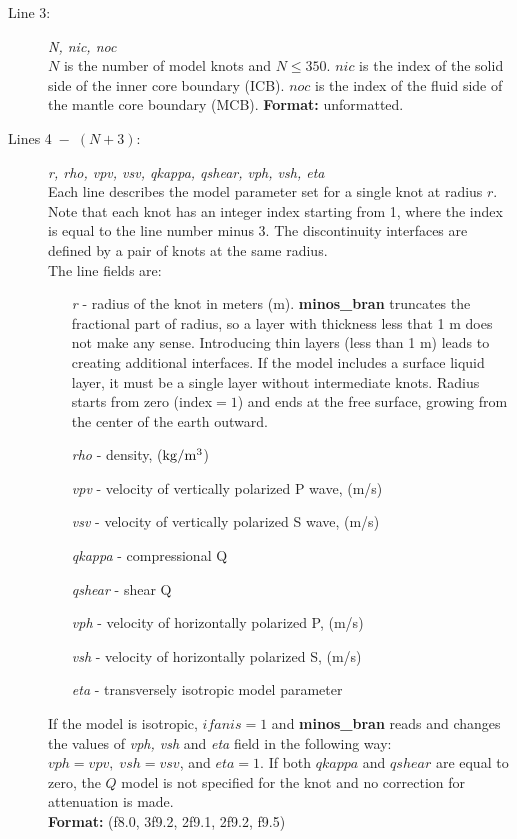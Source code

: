 \documentclass[11pt]{article}
\begin{document}
\begin{description}
\item[Line 3:] {\it N, nic, noc} \\
$N$ is the number of model knots and $N \leq 350$. $nic$ is the 
index of the solid side of the inner core boundary (ICB). $noc$ is the index of the
fluid side of the mantle core boundary (MCB). 
{\bf Format:} unformatted.
\item[Lines 4$\;-\;(N+3)$:] {\it r, rho, vpv, vsv, qkappa, qshear, vph, vsh, eta} \\
Each line describes the model parameter set for a single knot at radius $r$. 
Note that each knot has an integer index starting from 1, where the index is
equal to the line number minus 3. The discontinuity interfaces are
defined by a pair of knots at the same radius. \\
The line fields are:
\begin{itemize}
\item[{\it r}] - radius of the knot in meters (m). {\bf minos\_bran}
truncates the fractional part of radius, so a layer with thickness less that 1 m 
does not make any sense. Introducing thin layers (less than 1 m) leads to 
creating additional interfaces. If the model includes a surface liquid layer,
it must be a single layer without intermediate knots.
Radius starts from zero (index$=1$) and ends at the free surface,
growing from the center of the earth outward.
\item[{\it rho}] - density, ($\rm kg/m^3$)
\item[{\it vpv}] - velocity of vertically polarized P wave, (m/s)
\item[{\it vsv}] - velocity of vertically polarized S wave, (m/s)
\item[{\it qkappa}] - compressional Q
\item[{\it qshear}] - shear Q
\item[{\it vph}] - velocity of horizontally polarized P, (m/s)
\item[{\it vsh}] - velocity of horizontally polarized S, (m/s)
\item[{\it eta}] - transversely isotropic model parameter
\end{itemize}
If the model is isotropic, $ifanis = 1$ and {\bf minos\_bran} reads and changes
the values of {\it vph, vsh} and {\it eta} field in the following way:
$ vph=vpv,\;vsh=vsv$, and $eta=1$.
If both $qkappa$ and $qshear$ are equal to zero, the $Q$ model is not specified for the
knot and no correction for attenuation is made.\\
{\bf Format:} (f8.0, 3f9.2, 2f9.1, 2f9.2, f9.5)
\end{description}
\end{document}
